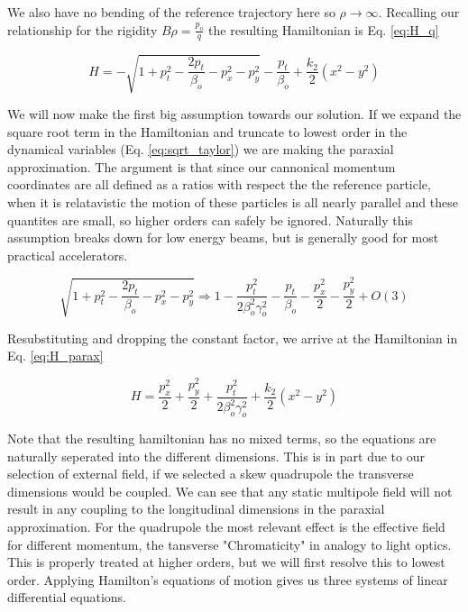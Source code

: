 We also have no bending of the reference trajectory here so $\rho \rightarrow \infty$. Recalling our relationship for the rigidity $B\rho = \frac{p_o}{q}$ the resulting Hamiltonian is Eq. \ref{eq:H_q}

\begin{equation} \label{eq:H_q}
	H = -\sqrt{1 + p_t^2 - \frac{2p_t}{\beta_o} - p_x^2 - p_y^2} - \frac{p_t}{\beta_o} + \frac{k_2}{2}(x^2 - y^2)
\end{equation}

We will now make the first big assumption towards our solution. If we expand the square root term in the Hamiltonian and truncate to lowest order in the dynamical variables (Eq. \ref{eq:sqrt_taylor}) we are making the paraxial approximation. The argument is that since our cannonical momentum coordinates are all defined as a ratios with respect the the reference particle, when it is relatavistic the motion of these particles is all nearly parallel and these quantites are small, so higher orders can safely be ignored. Naturally this assumption breaks down for low energy beams, but is generally good for most practical accelerators.

\begin{equation} \label{eq:sqrt_taylor}
	\sqrt{1 + p_t^2 - \frac{2p_t}{\beta_o} - p_x^2 - p_y^2} \Rightarrow 1 - \frac{p_t^2}{2\beta_o^2\gamma_o^2} - \frac{p_t}{\beta_o} - \frac{p_x^2}{2} - \frac{p_y^2}{2} + O(3)
\end{equation}

Resubstituting and dropping the constant factor, we arrive at the Hamiltonian in Eq. \ref{eq:H_parax}

\begin{equation} \label{eq:H_parax}
	H = \frac{p_x^2}{2} + \frac{p_y^2}{2} + \frac{p_t^2}{2\beta_o^2\gamma_o^2} + \frac{k_2}{2}(x^2 - y^2)
\end{equation}

Note that the resulting hamiltonian has no mixed terms, so the equations are naturally seperated into the different dimensions. This is in part due to our selection of external field, if we selected a skew quadrupole the transverse dimensions would be coupled. We can see that any static multipole field will not result in any coupling to the longitudinal dimensions in the paraxial approximation. For the quadrupole the most relevant effect is the effective field for different momentum, the tansverse "Chromaticity" in analogy to light optics. This is properly treated at higher orders, but we will first resolve this to lowest order. Applying Hamilton's equations of motion gives us three systems of linear differential equations.

